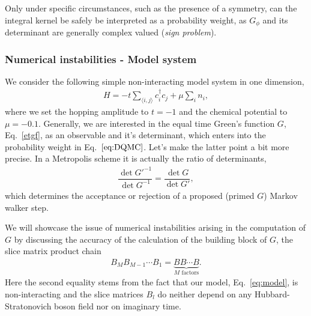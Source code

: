 \documentclass[%
 reprint,
superscriptaddress,
showpacs,
 amsmath,amssymb,
 aps,
 prb,
longbibliography,
]{revtex4-1}
\begin{document}
Only under specific circumstances, such as the presence of a symmetry, can the integral kernel be safely be interpreted as a probability weight, as $G_\phi$ and its determinant are generally complex valued (\textit{sign problem}).

\subsubsection{Numerical instabilities - Model system}

We consider the following simple non-interacting model system in one dimension,
\begin{align}
	H = -t\sum_{\langle i,j \rangle} c_i^\dagger c_j + \mu \sum_i n_i \label{eq:model},
\end{align}
where we set the hopping amplitude to $t=-1$ and the chemical potential to $\mu=-0.1$.
Generally, we are interested in the equal time Green's function $G$, Eq.~\eqref{etgf}, as an observable and it's determinant, which enters into the probability weight in Eq.~$\eqref{eq:DQMC}$. Let's make the latter point a bit more precise. In a Metropolis scheme it is actually the ratio of determinants,
\begin{align}
\dfrac{\det G'^{-1}}{\det G^{-1}} = \dfrac{\det G}{\det G'},
\end{align}
which determines the acceptance or rejection of a proposed (primed $G$) Markov walker step.

We will showcase the issue of numerical instabilities arising in the computation of $G$ by discussing the accuracy of the calculation of the building block of $G$, the slice matrix product chain
\begin{align}
B_M B_{M-1} \cdots B_1 = \underbrace{B B \cdots B}_{M \textrm{ factors}}. \label{eq:Bchain}
\end{align}
Here the second equality stems from the fact that our model, Eq.~\ref{eq:model}, is non-interacting and the slice matrices $B_l$ do neither depend on any Hubbard-Stratonovich boson field nor on imaginary time.
\end{document}
